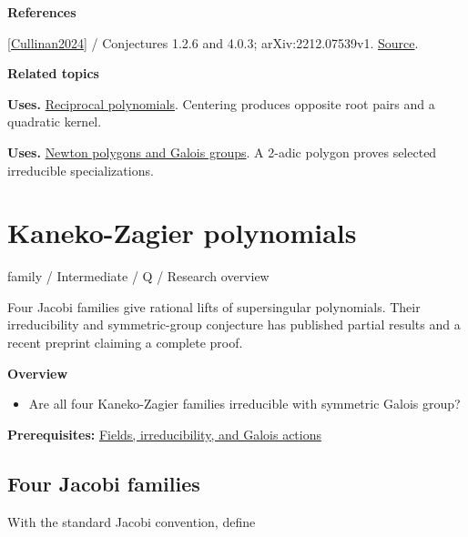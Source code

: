 \documentclass[11pt,a4paper,oneside,openany]{book}
\newenvironment{sources}{\par\smallskip\begingroup\footnotesize\color{atlasgray}\leftskip=10pt\setlength{\parskip}{2pt}}{\par\endgroup\smallskip}
\begin{document}
\begin{sources}
\textbf{References}\par\smallskip
\noindent\hyperlink{ref:Cullinan2024}{[Cullinan2024]} / Conjectures 1.2.6 and 4.0.3; arXiv:2212.07539v1.  \href{https://www.mathjournals.org/jrms/2024-039-004/2024-039-004-002.html}{Source}.\par
\end{sources}\color{black}
\par\medskip\begingroup\footnotesize\setlength{\parskip}{1pt}\textbf{\sffamily\color{atlasgreen}Related topics}\par
\color{black}\textbf{Uses.} \hyperlink{article:reciprocity}{Reciprocal polynomials}. Centering produces opposite root pairs and a quadratic kernel.\par
\color{black}\textbf{Uses.} \hyperlink{article:newton-polygons}{Newton polygons and Galois groups}. A 2-adic polygon proves selected irreducible specializations.\par
\endgroup
\chapter{Kaneko-Zagier polynomials}\label{article:kaneko-zagier}\hypertarget{article:kaneko-zagier}{}\color{black}
{\sffamily\small\color{atlasgold}family / Intermediate / Q / Research overview}\par\medskip
Four Jacobi families give rational lifts of supersingular polynomials. Their irreducibility and symmetric-group conjecture has published partial results and a recent preprint claiming a complete proof.\par\medskip
\textbf{Overview}\begin{itemize}
\item Are all four Kaneko-Zagier families irreducible with symmetric Galois group?
\end{itemize}
{\small\textbf{Prerequisites:} \hyperlink{article:foundations}{Fields, irreducibility, and Galois actions}}\par
{}\section{Four Jacobi families}
\color{black} With the standard Jacobi convention, define\par
\end{document}
